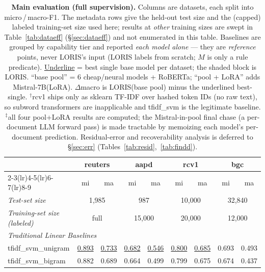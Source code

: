 \documentclass[11pt]{article}
\begin{document}
\begin{table}[h]\centering
\caption{\textbf{Main evaluation (full supervision).} Columns are datasets, each split into micro\,/\,macro-F1.
The metadata rows give the held-out test size and the (capped) labeled training-set size used here; results
at \emph{other} training sizes are swept in Table~\ref{tab:dataeff} (\S\ref{sec:dataeff}) and not enumerated
in this table. Baselines are grouped by capability tier and reported \emph{each model alone} --- they are
\emph{reference} points, never LORIS's input (LORIS labels from scratch; $M$ is only a rule predicate). \underline{Underline}
= best single base model per dataset; the \colorbox{blue!8}{shaded} block is LORIS. ``base pool'' = 6
cheap/neural models + RoBERTa; ``pool + LoRA'' adds Mistral-7B(LoRA). $\Delta$macro is LORIS(base pool) minus
the underlined best-single. $^\dagger$rcv1 ships only as sklearn TF-IDF over hashed token IDs (no raw text),
so subword transformers are inapplicable and tfidf\_svm is the legitimate baseline. $^\ddagger$all four pool+LoRA results are computed; the Mistral-in-pool final chase (a per-document
LLM forward pass) is made tractable by memoizing each model's per-document prediction.
Residual-error and recoverability analysis is deferred to \S\ref{sec:err}
(Tables~\ref{tab:resid},~\ref{tab:findd}).}
\label{tab:big}
\footnotesize\setlength{\tabcolsep}{4pt}
\begin{tabular}{lcccccccc}
\toprule
\textbf{} & \multicolumn{2}{c}{\textbf{reuters}} & \multicolumn{2}{c}{\textbf{aapd}} & \multicolumn{2}{c}{\textbf{rcv1}} & \multicolumn{2}{c}{\textbf{bgc}} \\
\cmidrule(lr){2-3}\cmidrule(lr){4-5}\cmidrule(lr){6-7}\cmidrule(lr){8-9}
 & mi & ma & mi & ma & mi & ma & mi & ma \\
\midrule
\emph{Test-set size} & \multicolumn{2}{c}{1,985} & \multicolumn{2}{c}{987} & \multicolumn{2}{c}{10,000} & \multicolumn{2}{c}{32,840} \\
\emph{Training-set size (labeled)} & \multicolumn{2}{c}{full} & \multicolumn{2}{c}{15,000} & \multicolumn{2}{c}{20,000} & \multicolumn{2}{c}{12,000} \\
\midrule
\multicolumn{9}{l}{\textit{Traditional Linear Baselines}}\\
\quad tfidf\_svm\_unigram & \underline{0.893} & \underline{0.733} & \underline{0.682} & \underline{0.546} & \underline{0.800} & \underline{0.685} & 0.693 & 0.493 \\
\quad tfidf\_svm\_bigram & 0.882 & 0.689 & 0.664 & 0.499 & 0.799 & 0.675 & 0.674 & 0.437 \\

\end{tabular}
\end{table}
\end{document}
